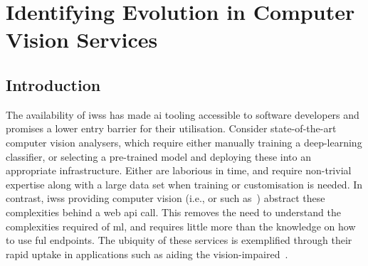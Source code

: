 \chapter[Identifying Evolution in Computer Vision Services]
{Identifying Evolution in Computer Vision Services}
\label{ch:icsme2019}
\graphicspath{{mainmatter/publications/figures/icsme2019/}}

\def \googleapi {A}
\def \azureapi {B}
\def \awsapi {C}

\glsresetall
\begin{abstract}
Recent advances in \gls{ai} and \gls{ml}, such as computer vision, are now available as \glspl{iws} and their accessibility and simplicity is compelling. Multiple vendors now offer this technology as cloud services and developers want to leverage these advances to provide value to end-users. 
However, there is no firm investigation into the maintenance and evolution risks arising from use of these \glspl{iws}; in particular, their behavioural consistency and transparency of their functionality.
We evaluated the responses of three different \glspl{iws} (specifically computer vision) over 11 months using 3 different data sets, verifying responses against the respective documentation and assessing evolution risk. 
We found that there are: (1)~inconsistencies in how these services behave; (2)~evolution risk in the responses; and (3)~a lack of clear communication that documents these risks and inconsistencies.
We propose a set of recommendations to both developers and \gls{iws} providers to inform risk and assist maintainability.
\end{abstract}
\glsresetall

\section{Introduction}

The availability of \glspl{iws} has made \gls{ai} tooling accessible to software developers and promises a lower entry barrier for their utilisation. Consider state-of-the-art computer vision analysers, which require either manually training a deep-learning classifier, or selecting a pre-trained model and deploying these into an appropriate infrastructure. Either are laborious in time, and require non-trivial expertise along with a large data set when training or customisation is needed.
In contrast, \glspl{iws} providing computer vision (i.e.,  or  such as~) abstract these complexities behind a web \gls{api} call. This removes the need to understand the complexities required of \gls{ml}, and requires little more than the knowledge on how to use ful endpoints. The ubiquity of these services is exemplified through their rapid uptake in applications such as aiding the vision-impaired~\citep{Reis:2018cp,daMotaSilveira:2017vp}.

